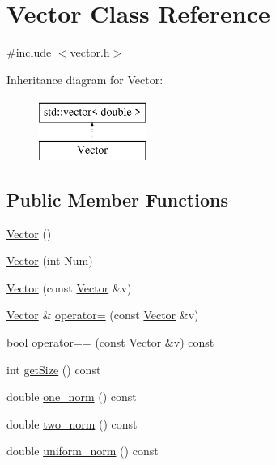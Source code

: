\hypertarget{class_vector}{}\section{Vector Class Reference}
\label{class_vector}


{\ttfamily \#include $<$vector.\+h$>$}

Inheritance diagram for Vector\+:\begin{figure}[H]
\begin{center}
\leavevmode
\includegraphics[height=2.000000cm]{class_vector}
\end{center}
\end{figure}
\subsection*{Public Member Functions}
\begin{DoxyCompactItemize}
\item 
\hyperlink{class_vector_a6f80c73b5f18dcf3f8e36065bdc8b9e5}{Vector} ()
\item 
\hyperlink{class_vector_acbdf66550f2caa0a64e0b356fb63a277}{Vector} (int Num)
\item 
\hyperlink{class_vector_a5f04e343b7306ad11f8a82c89b486764}{Vector} (const \hyperlink{class_vector}{Vector} \&v)
\item 
\hyperlink{class_vector}{Vector} \& \hyperlink{class_vector_ae48c467a9f65d60e2f7455aba4ca1239}{operator=} (const \hyperlink{class_vector}{Vector} \&v)
\item 
bool \hyperlink{class_vector_ade5fbd0cd01b034d1907e0c93433320c}{operator==} (const \hyperlink{class_vector}{Vector} \&v) const
\item 
int \hyperlink{class_vector_afbb7966ec4107c43ec15cccc47fcaef7}{get\+Size} () const
\item 
double \hyperlink{class_vector_a6752a90058ddef427ca6aed12946a737}{one\+\_\+norm} () const
\item 
double \hyperlink{class_vector_a4f501290a50d057bb6c57ea64d7e70a4}{two\+\_\+norm} () const
\item 
double \hyperlink{class_vector_a50b72131eaf3698a9876d99ab6912a32}{uniform\+\_\+norm} () const
\end{DoxyCompactItemize}
